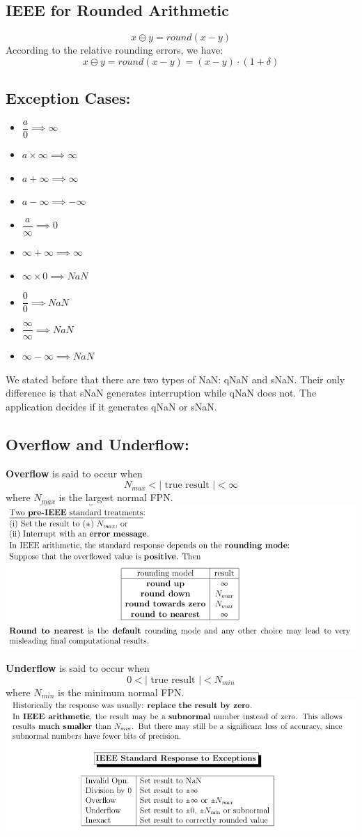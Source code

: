 \documentclass [9 pt]{article}
\theoremstyle{definition}
\begin{document}
\subsection*{IEEE for Rounded Arithmetic}
$$ x \ominus y = round(x - y) $$
According to the relative rounding errors, we have:
$$ x \ominus y = round(x - y) = (x - y)\cdot (1 + \delta) $$

\subsection*{Exception Cases:}
\begin{itemize}
	\item $\dfrac{a}{0} \implies \infty$
	\item $a \times \infty \implies \infty$
	\item  $a + \infty \implies \infty$ 
	\item $a - \infty \implies  -\infty$ 
	\item $\dfrac{a}{ \infty} \implies 0$
	\item  $\infty + \infty \implies \infty$ 
	\item $ \infty \times 0 \implies NaN $
	\item $\dfrac{0}{0} \implies NaN$
	\item $\dfrac{\infty }{ \infty} \implies NaN$
	\item $\infty - \infty \implies NaN$ 
\end{itemize}
We stated before that there are two types of NaN: qNaN and sNaN. Their only difference is that sNaN generates interruption while qNaN does not. The application decides if it generates qNaN or sNaN. 

\subsection*{Overflow and Underflow:}
\textbf{Overflow} is said to occur when
$$ N_{max} < |\text{ true result }| < \infty $$
where $N_{max}$ is the largest normal FPN.\\
\newline
\includegraphics{2}

\newpage
\textbf{Underflow} is said to occur when
$$ 0 < |\text{ true result }| < N_{min} $$
where $N_{min}$ is the minimum normal FPN.\\
\newline
\newline
\includegraphics{3}
\end{document}
